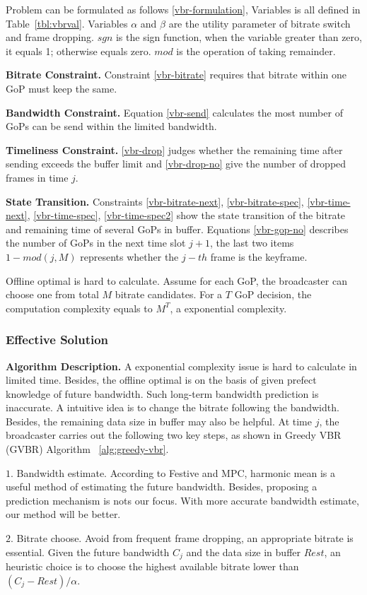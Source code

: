 Problem can be formulated as follows \ref{vbr-formulation}, Variables is all defined in Table~\ref{tbl:vbrval}. Variables $\alpha$ and $\beta$ are the utility parameter of bitrate switch and frame dropping. $sgn$ is the sign function, when the variable greater than zero, it equals 1; otherwise equals zero. $mod$ is the operation of taking remainder.

\textbf{Bitrate Constraint.} Constraint \ref{vbr-bitrate} requires that bitrate within one GoP must keep the same.

\textbf{Bandwidth Constraint.} Equation \ref{vbr-send} calculates the most number of GoPs can be send within the limited bandwidth.

\textbf{Timeliness Constraint.} \ref{vbr-drop} judges whether the remaining time after sending exceeds the buffer limit and \ref{vbr-drop-no} give the number of dropped frames in time $j$.

\textbf{State Transition.} Constraints \ref{vbr-bitrate-next}, \ref{vbr-bitrate-spec}, \ref{vbr-time-next}, \ref{vbr-time-spec}, \ref{vbr-time-spec2} show the state transition of the bitrate and remaining time of several GoPs in buffer. Equations \ref{vbr-gop-no} describes the number of GoPs in the next time slot $j+1$, the last two items $1-mod(j,M)$ represents whether the $j-th$ frame is the keyframe.

Offline optimal is hard to calculate. Assume for each GoP, the broadcaster can choose one from total $M$ bitrate candidates. For a $T$ GoP decision, the computation complexity equals to $M^T$, a exponential complexity.

\subsubsection{Effective Solution}

\textbf{Algorithm Description.} A exponential complexity issue is hard to calculate in limited time. Besides, the offline optimal is on the basis of given prefect knowledge of future bandwidth. Such long-term bandwidth prediction is inaccurate. A intuitive idea is to change the bitrate following the bandwidth. Besides, the remaining data size in buffer may also be helpful. At time $j$, the broadcaster carries out the following two key steps, as shown in Greedy VBR (GVBR) Algorithm ~\ref{alg:greedy-vbr}.

$1.$ Bandwidth estimate. According to Festive and MPC, harmonic mean is a useful method of estimating the future bandwidth. Besides, proposing a prediction mechanism is nots our focus. With more accurate bandwidth estimate, our method will be better.

$2.$ Bitrate choose. Avoid from frequent frame dropping, an appropriate bitrate is essential. Given the future bandwidth $C_j$ and the data size in buffer $Rest$, an heuristic choice is to choose the highest available bitrate lower than $(C_j-Rest)/\alpha$.
